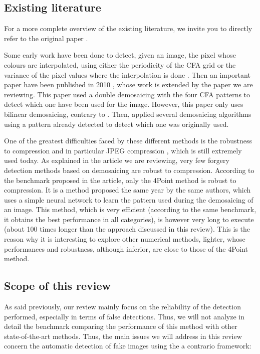 \documentclass[sigconf, nonacm]{acmart}
\begin{document}
\subsection{Existing literature}

For a more complete overview of the existing literature, we invite you to directly refer to the original paper \cite{bammey_demosaicing_2022}.

Some early work have been done to detect, given an image, the pixel whose colours are interpolated, using either the periodicity of the CFA grid or the variance of the pixel values where the interpolation is done \cite{popescu_exposing_2005, ferrara_image_2012}. Then an important paper have been published in 2010 \cite{memon_detection_2010}, whose work is extended by the paper \cite{bammey_demosaicing_2022} we are reviewing. This paper used a double demosaicing with the four CFA patterns to detect which one have been used for the image. However, this paper only uses bilinear demosaicing, contrary to \cite{bammey_demosaicing_2022}. Then, \cite{milani_demosaicing_2014} applied several demosaicing algorithms using a pattern already detected to detect which one was originally used.

One of the greatest difficulties faced by these different methods is the robustness to compression and in particular JPEG compression \cite{skodras_jpeg_2001}, which is still extremely used today. As explained in the article we are reviewing, very few forgery detection methods based on demosaicing are robust to compression. According to the benchmark proposed in the article, only the 4Point method \cite{bammey_forgery_2022} is robust to compression. It is a method proposed the same year by the same authors, which uses a simple neural network to learn the pattern used during the demosaicing of an image. This method, which is very efficient (according to the same benchmark, it obtains the best performance in all categories), is however very long to execute (about 100 times longer than the approach discussed in this review). This is the reason why it is interesting to explore other numerical methods, lighter, whose performances and robustness, although inferior, are close to those of the 4Point method.

\subsection{Scope of this review}

As said previously, our review mainly focus on the
reliability of the detection performed, especially in terms of false detections. Thus, we will not analyze in detail the benchmark comparing the performance of this method with other state-of-the-art methods. Thus, the main issues we will address in this review concern the automatic detection of fake images using the a contrario framework:
\end{document}
